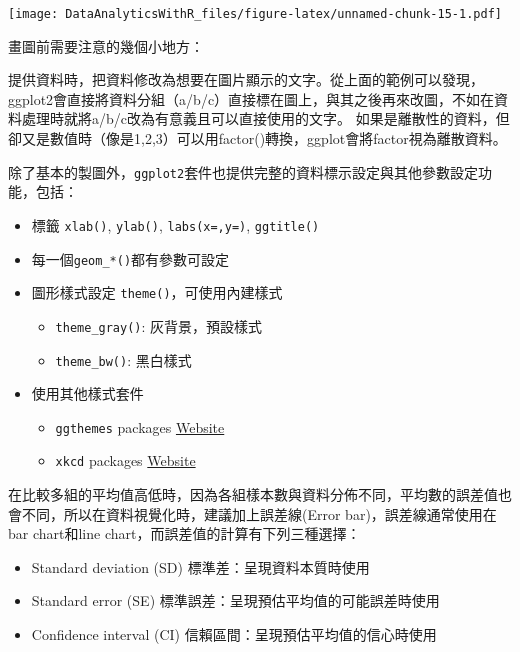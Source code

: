 \documentclass[
]{book}
\providecommand{\tightlist}{%
  \setlength{\itemsep}{0pt}\setlength{\parskip}{0pt}}
\begin{document}
\texttt{[image: DataAnalyticsWithR\_files/figure-latex/unnamed-chunk-15-1.pdf]}

畫圖前需要注意的幾個小地方：

提供資料時，把資料修改為想要在圖片顯示的文字。從上面的範例可以發現，ggplot2會直接將資料分組（a/b/c）直接標在圖上，與其之後再來改圖，不如在資料處理時就將a/b/c改為有意義且可以直接使用的文字。
如果是離散性的資料，但卻又是數值時（像是1,2,3）可以用factor()轉換，ggplot會將factor視為離散資料。

除了基本的製圖外，\texttt{ggplot2}套件也提供完整的資料標示設定與其他參數設定功能，包括：

\begin{itemize}
\tightlist
\item
  標籤 \texttt{xlab()}, \texttt{ylab()}, \texttt{labs(x=,y=)}, \texttt{ggtitle()}
\item
  每一個\texttt{geom\_*()}都有參數可設定
\item
  圖形樣式設定 \texttt{theme()}，可使用內建樣式

  \begin{itemize}
  \tightlist
  \item
    \texttt{theme\_gray()}: 灰背景，預設樣式
  \item
    \texttt{theme\_bw()}: 黑白樣式
  \end{itemize}
\item
  使用其他樣式套件

  \begin{itemize}
  \tightlist
  \item
    \texttt{ggthemes} packages \href{https://cran.r-project.org/web/packages/ggthemes/vignettes/ggthemes.html}{Website}
  \item
    \texttt{xkcd} packages \href{http://xkcd.r-forge.r-project.org/}{Website}
  \end{itemize}
\end{itemize}

在比較多組的平均值高低時，因為各組樣本數與資料分佈不同，平均數的誤差值也會不同，所以在資料視覺化時，建議加上誤差線(Error bar)，誤差線通常使用在bar chart和line chart，而誤差值的計算有下列三種選擇：

\begin{itemize}
\tightlist
\item
  Standard deviation (SD) 標準差：呈現資料本質時使用
\item
  Standard error (SE) 標準誤差：呈現預估平均值的可能誤差時使用
\item
  Confidence interval (CI) 信賴區間：呈現預估平均值的信心時使用
\end{itemize}
\end{document}
